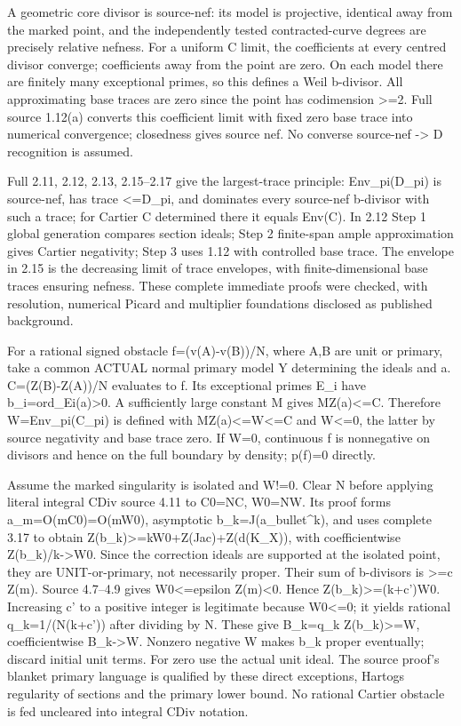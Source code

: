 \documentclass[11pt]{article}
\begin{document}
A geometric core divisor is source-nef: its model is projective, identical away from the marked point, and the independently tested contracted-curve degrees are precisely relative nefness. For a uniform C limit, the coefficients at every centred divisor converge; coefficients away from the point are zero. On each model there are finitely many exceptional primes, so this defines a Weil b-divisor. All approximating base traces are zero since the point has codimension >=2. Full source 1.12(a) converts this coefficient limit with fixed zero base trace into numerical convergence; closedness gives source nef. No converse source-nef -> D recognition is assumed.

Full 2.11, 2.12, 2.13, 2.15--2.17 give the largest-trace principle: Env\_pi(D\_pi) is source-nef, has trace <=D\_pi, and dominates every source-nef b-divisor with such a trace; for Cartier C determined there it equals Env(C). In 2.12 Step 1 global generation compares section ideals; Step 2 finite-span ample approximation gives Cartier negativity; Step 3 uses 1.12 with controlled base trace. The envelope in 2.15 is the decreasing limit of trace envelopes, with finite-dimensional base traces ensuring nefness. These complete immediate proofs were checked, with resolution, numerical Picard and multiplier foundations disclosed as published background.

For a rational signed obstacle f=(v(A)-v(B))/N, where A,B are unit or primary, take a common ACTUAL normal primary model Y determining the ideals and a. C=(Z(B)-Z(A))/N evaluates to f. Its exceptional primes E\_i have b\_i=ord\_Ei(a)>0. A sufficiently large constant M gives MZ(a)<=C. Therefore W=Env\_pi(C\_pi) is defined with MZ(a)<=W<=C and W<=0, the latter by source negativity and base trace zero. If W=0, continuous f is nonnegative on divisors and hence on the full boundary by density; p(f)=0 directly.

Assume the marked singularity is isolated and W!=0. Clear N before applying literal integral CDiv source 4.11 to C0=NC, W0=NW. Its proof forms a\_m=O(mC0)=O(mW0), asymptotic b\_k=J(a\_bullet\textasciicircum{}k), and uses complete 3.17 to obtain Z(b\_k)>=kW0+Z(Jac)+Z(d(K\_X)), with coefficientwise Z(b\_k)/k->W0. Since the correction ideals are supported at the isolated point, they are UNIT-or-primary, not necessarily proper. Their sum of b-divisors is >=c Z(m). Source 4.7--4.9 gives W0<=epsilon Z(m)<0. Hence Z(b\_k)>=(k+c')W0. Increasing c' to a positive integer is legitimate because W0<=0; it yields rational q\_k=1/(N(k+c')) after dividing by N. These give B\_k=q\_k Z(b\_k)>=W, coefficientwise B\_k->W. Nonzero negative W makes b\_k proper eventually; discard initial unit terms. For zero use the actual unit ideal. The source proof's blanket primary language is qualified by these direct exceptions, Hartogs regularity of sections and the primary lower bound. No rational Cartier obstacle is fed uncleared into integral CDiv notation.
\end{document}
